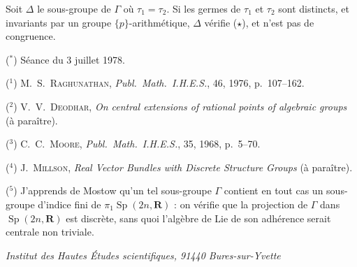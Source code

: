 \documentclass[11pt]{amsart}
\theoremstyle{plain}
\theoremstyle{definition}
\DeclareMathOperator{\Sp}{Sp}
\begin{document}
Soit $\Delta$ le sous-groupe de $\Gamma$ o\`u $\tau_1=\tau_2$. Si les germes de $\tau_1$ et $\tau_2$ sont distincts, et invariants par un groupe $\{p\}$-arithm\'etique, $\Delta$ v\'erifie ($\star$), et n'est pas de congruence.

\vspace{1cm}

\noindent ($^*$) S\'eance du 3 juillet 1978.

\noindent ($^1$) M.\ S.\ \textsc{Raghunathan}, \textit{Publ.\ Math.\ I.H.E.S.}, 46, 1976, p.\ 107--162.

\noindent ($^2$) V.\ V.\ \textsc{Deodhar}, \textit{On central extensions of rational points of algebraic groups} (\`a para\^itre).

\noindent ($^3$) C.\ C.\ \textsc{Moore}, \textit{Publ.\ Math.\ I.H.E.S.}, 35, 1968, p.\ 5--70.

\noindent ($^4$) J.\ \textsc{Millson}, \textit{Real Vector Bundles with Discrete Structure Groups} (\`a para\^itre).

\noindent ($^5$) J'apprends de Mostow qu'un tel sous-groupe $\Gamma$ contient en tout cas un sous-groupe d'indice fini de $\pi_1\Sp(2n,\mathbf{R})$ : on v\'erifie que la projection de $\Gamma$ dans $\Sp(2n,\mathbf{R})$ est discr\`ete, sans quoi l'alg\`ebre de Lie de son adh\'erence serait centrale non triviale.

\vspace{1cm}

\begin{flushright}
\textit{Institut des Hautes \'Etudes scientifiques, 91440 Bures-sur-Yvette}
\end{flushright}
\end{document}
